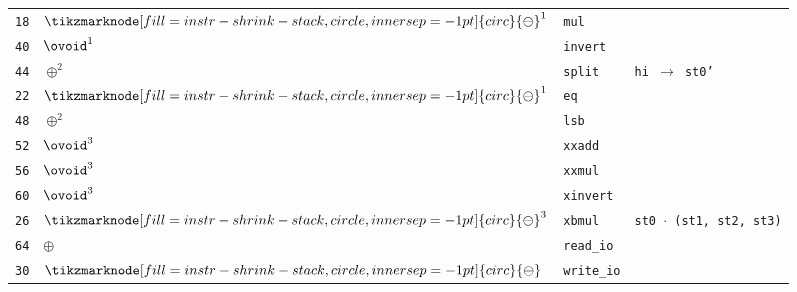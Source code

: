\documentclass{article}
\newcommand{\shrinkstack}[1]{\tikzmarknode[fill=instr-shrink-stack,circle,inner sep=-1pt]{circ}{#1}}
\newcommand{\hintsplit}{
    \textcolor{hint}{\texttt{hi $\rightarrow$ st0'}}
}
\newcommand{\hintxbmul}{
    \textcolor{hint}{\texttt{st0 $\cdot$ (st1, st2, st3)}}
}
\newcommand{\ssominus}{
    \shrinkstack{\ensuremath{\ominus}}
}
\begin{document}
\begin{tabular}{rlll}
    \texttt{18} & $\ssominus^1$ & \texttt{mul}                                       &                \\
    \texttt{40} & $\ovoid^1$    & \texttt{invert}                                    &                \\
    \texttt{44} & $\oplus^2$    & \texttt{split}                                     & \hintsplit     \\
    \texttt{22} & $\ssominus^1$ & \texttt{eq}                                        &                \\
    \texttt{48} & $\oplus^2$    & \texttt{lsb}                                       &                \\
    \texttt{52} & $\ovoid^3$    & \texttt{xxadd}                                     &                \\
    \texttt{56} & $\ovoid^3$    & \texttt{xxmul}                                     &                \\
    \texttt{60} & $\ovoid^3$    & \texttt{xinvert}                                   &                \\
    \texttt{26} & $\ssominus^3$ & \texttt{xbmul}                                     & \hintxbmul     \\
    \texttt{64} & $\oplus$      & \texttt{read\_io}                                  &                \\
    \texttt{30} & $\ssominus$   & \texttt{write\_io}                                 &
\end{tabular}
\end{document}
